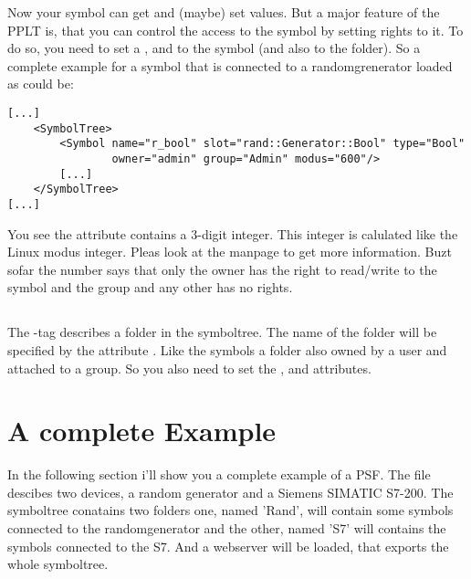 Now your symbol can get and (maybe) set values. But a major feature of the PPLT is, that you can control the
access to the symbol by setting rights to it. To do so, you need to set a ,  and
 to the symbol (and also to the folder). So a complete example for a symbol that is connected to
a randomgrenerator loaded as  could be:
\begin{verbatim}
[...]
    <SymbolTree>
        <Symbol name="r_bool" slot="rand::Generator::Bool" type="Bool" 
                owner="admin" group="Admin" modus="600"/>
        [...]
    </SymbolTree>
[...]
\end{verbatim}
You see the attribute  contains a 3-digit integer. This integer is calulated like the Linux modus integer. Pleas look
at the  manpage to get more information. Buzt sofar the number  says that only the owner has the right to 
read/write to the symbol and the group and any other has no rights.


\subsection{}
The -tag describes a folder in the symboltree. The name of the folder will be specified by the
attribute . Like the symbols a folder also owned by a user and attached to a group. So you also need 
to set the ,  and  attributes. 

\newpage
\section{A complete Example}
In the following section i'll show you a complete example of a PSF. The file descibes two devices, a random generator and
a Siemens SIMATIC S7-200. The symboltree conatains two folders one, named 'Rand', will contain some symbols connected
to the randomgenerator and the other, named 'S7' will contains the symbols connected to the S7. And a webserver will be loaded, 
that exports the whole symboltree. 




